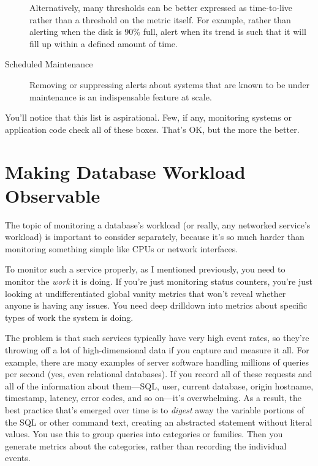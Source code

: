 \documentclass{vivid_layout}
\begin{document}
\begin{description}
Alternatively, many thresholds can be better expressed as time-to-live rather
than a threshold on the metric itself. For example, rather than alerting when
the disk is 90\% full, alert when its trend is such that it will fill up within
a defined amount of time.

\item[Scheduled Maintenance] Removing or suppressing alerts about systems that
are known to be under maintenance is an indispensable feature at scale.

\end{description}

You'll notice that this list is aspirational. Few, if any, monitoring systems
or application code check all of these boxes. That's OK, but the more the
better.

\section{Making Database Workload Observable}

The topic of monitoring a database's workload (or really, any networked
service's workload) is important to consider separately, because it's so much
harder than monitoring something simple like CPUs or network interfaces.

To monitor such a service properly, as I mentioned previously, you need to
monitor the \emph{work} it is doing. If you're just monitoring status counters,
you're just looking at undifferentiated global vanity metrics that won't
reveal whether anyone is having any issues. You need deep drilldown into metrics
about specific types of work the system is doing.

The problem is that such services typically have very high event rates, so
they're throwing off a lot of high-dimensional data if you capture and measure
it all. For example, there are many examples of server software handling
millions of queries per second (yes, even relational databases). If you record
all of these requests and all of the information about them---SQL, user, current
database, origin hostname, timestamp, latency, error codes, and so on---it's 
overwhelming. As a result, the best practice that's emerged over time is to
\emph{digest} away the variable portions of the SQL or other command text,
creating an abstracted statement without literal values. You use this to
group queries into categories or families. Then you generate metrics about the
categories, rather than recording the individual events.
\end{document}
